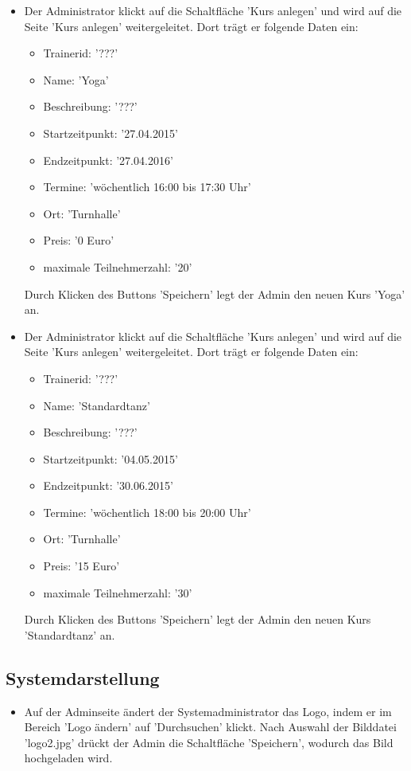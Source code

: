 \documentclass[a4paper]{scrreprt}
\begin{document}
\begin{itemize}
				\item {}
				Der Administrator klickt auf die Schaltfläche 'Kurs anlegen' und wird auf die Seite 'Kurs anlegen' weitergeleitet. Dort trägt er folgende Daten ein:
						\begin{itemize}
							\item Trainerid: '???'
							\item Name: 'Yoga'
							\item Beschreibung: '???'
							\item Startzeitpunkt: '27.04.2015'
							\item Endzeitpunkt: '27.04.2016'
							\item Termine: 'wöchentlich 16:00 bis 17:30 Uhr'
							\item Ort: 'Turnhalle'
							\item Preis: '0 Euro'
							\item maximale Teilnehmerzahl: '20'	
						\end{itemize}
				Durch Klicken des Buttons 'Speichern' legt der Admin den neuen Kurs 'Yoga' an.
				
				\item {}
				Der Administrator klickt auf die Schaltfläche 'Kurs anlegen' und wird auf die Seite 'Kurs anlegen' weitergeleitet. Dort trägt er folgende Daten ein:
				\begin{itemize}
					\item Trainerid: '???'
					\item Name: 'Standardtanz'
					\item Beschreibung: '???'
					\item Startzeitpunkt: '04.05.2015'
					\item Endzeitpunkt: '30.06.2015'
					\item Termine: 'wöchentlich 18:00 bis 20:00 Uhr'
					\item Ort: 'Turnhalle'
					\item Preis: '15 Euro'
					\item maximale Teilnehmerzahl: '30'	
				\end{itemize}
				Durch Klicken des Buttons 'Speichern' legt der Admin den neuen Kurs 'Standardtanz' an.
									
			\end{itemize}			
								
		\subsection{Systemdarstellung}
			\begin{itemize}
				 \item {} 
				 Auf der Adminseite ändert der Systemadministrator das Logo, indem er im Bereich 'Logo ändern' auf 'Durchsuchen' klickt. Nach Auswahl der Bilddatei 'logo2.jpg' drückt der Admin die Schaltfläche 'Speichern', wodurch das Bild hochgeladen wird.
			\end{itemize}
			
\end{document}
